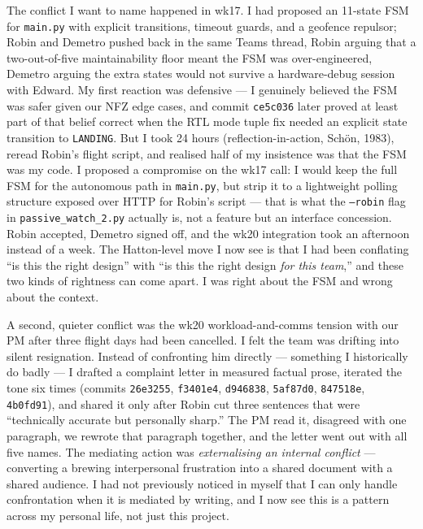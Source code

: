 The conflict I want to name happened in wk17. I had proposed an 11-state FSM for \texttt{main.py} with explicit transitions, timeout guards, and a geofence repulsor; Robin and Demetro pushed back in the same Teams thread, Robin arguing that a two-out-of-five maintainability floor meant the FSM was over-engineered, Demetro arguing the extra states would not survive a hardware-debug session with Edward. My first reaction was defensive --- I genuinely believed the FSM was safer given our NFZ edge cases, and commit \texttt{ce5c036} later proved at least part of that belief correct when the RTL mode tuple fix needed an explicit state transition to \texttt{LANDING}. But I took 24 hours (reflection-in-action, Sch\"on, 1983), reread Robin's flight script, and realised half of my insistence was that the FSM was my code. I proposed a compromise on the wk17 call: I would keep the full FSM for the autonomous path in \texttt{main.py}, but strip it to a lightweight polling structure exposed over HTTP for Robin's script --- that is what the \texttt{--robin} flag in \texttt{passive\_watch\_2.py} actually is, not a feature but an interface concession. Robin accepted, Demetro signed off, and the wk20 integration took an afternoon instead of a week. The Hatton-level move I now see is that I had been conflating ``is this the right design'' with ``is this the right design \emph{for this team},'' and these two kinds of rightness can come apart. I was right about the FSM and wrong about the context.

A second, quieter conflict was the wk20 workload-and-comms tension with our PM after three flight days had been cancelled. I felt the team was drifting into silent resignation. Instead of confronting him directly --- something I historically do badly --- I drafted a complaint letter in measured factual prose, iterated the tone six times (commits \texttt{26e3255}, \texttt{f3401e4}, \texttt{d946838}, \texttt{5af87d0}, \texttt{847518e}, \texttt{4b0fd91}), and shared it only after Robin cut three sentences that were ``technically accurate but personally sharp.'' The PM read it, disagreed with one paragraph, we rewrote that paragraph together, and the letter went out with all five names. The mediating action was \emph{externalising an internal conflict} --- converting a brewing interpersonal frustration into a shared document with a shared audience. I had not previously noticed in myself that I can only handle confrontation when it is mediated by writing, and I now see this is a pattern across my personal life, not just this project.

